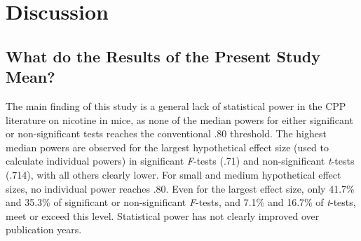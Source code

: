 \documentclass[authordate, meta]{jote-new-article}
\begin{document}
	\section{\textbf{Discussion}}



	\subsection{What do the Results of the Present Study Mean?}



	The main finding of this study is a general lack of statistical power in the CPP literature on nicotine in mice, as none of the median powers for either significant or non-significant tests reaches the conventional .80 threshold. The highest median powers are observed for the largest hypothetical effect size (used to calculate individual powers) in significant \emph{F}-tests (.71) and non-significant \emph{t}-tests (.714), with all others clearly lower. For small and medium hypothetical effect sizes, no individual power reaches .80. Even for the largest effect size, only 41.7\% and 35.3\% of significant or non-significant \emph{F}-tests, and 7.1\% and 16.7\% of \emph{t}-tests, meet or exceed this level. Statistical power has not clearly improved over publication years.
\end{document}
